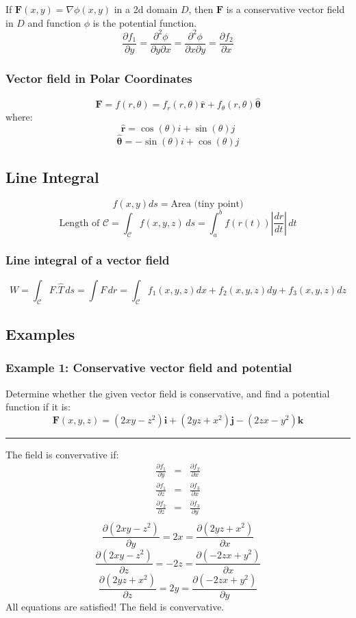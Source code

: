 If $\mathbf{F}(x,y)=\nabla\phi(x,y)$ in a 2d domain $D$, then $\mathbf{F}$ is a conservative vector field in $D$ and function $\phi$ is the potential function.
$${\frac{\partial f_{1}}{\partial y}}={\frac{\partial^{2}\phi}{\partial y\partial x}}={\frac{\partial^{2}\phi}{\partial x\partial y}}={\frac{\partial f_{2}}{\partial x}}$$
\subsubsection{Vector field in Polar Coordinates}
$$\mathbf{F}=f(r,\theta)=f_{r}(r,\theta)\mathbf{\hat{r}}+f_{\theta}(r,\theta)\mathbf{\hat{\theta}}$$
where:
$$\mathbf{\hat{r}}=\cos(\theta)i+\sin(\theta)j$$
$$\mathbf{\hat{\theta}}=-\sin(\theta)i+\cos(\theta)j$$
\subsection{Line Integral}
$$f(x,y)ds=\text{Area (tiny point)}$$
$$\text{Length of }\mathcal{C}=\int _{\mathcal{C}}f(x,y,z) \, ds=\int_{a}^{b}f(r(t)) \left|\frac{ dr }{ dt } \right| \, dt  $$
\subsubsection{Line integral of a vector field}
$$W=\int _{\mathcal{C}}F.\hat{T} \, ds =\int F \,dr =\int _{\mathcal{C}}f_{1}(x,y,z)dx+f_{2}(x,y,z)dy+f_{3}(x,y,z)dz $$
\subsection{Examples}
\subsubsection{Example 1: Conservative vector field and potential}
Determine whether the given vector field is conservative, and find a potential
function if it is:
$$\mathbf{F}(x,y,z)=( 2x y-z^{2})\mathbf{i}+( 2y z+ x^{2})\mathbf{j}-(2z x- y^{2})\mathbf{k}$$ 
\rule{\textwidth}{0.5pt}

The field is convervative if:
\begin{eqnarray*}
  \frac{\partial f_1}{\partial y}&=&\frac{\partial f_2}{\partial x} \\
  \frac{\partial f_1}{\partial z}&=&\frac{\partial f_3}{\partial x} \\
  \frac{\partial f_2}{\partial z}&=&\frac{\partial f_3}{\partial y} \\
\end{eqnarray*}
$$\frac{\partial (2xy-z^2)}{\partial y}=2x=\frac{\partial (2yz+x^2)}{\partial x} $$
$$ \frac{\partial (2xy-z^2)}{\partial z}=-2z=\frac{\partial (-2zx+y^2)}{\partial x} $$
$$\frac{\partial (2yz+x^2)}{\partial z}=2y=\frac{\partial (-2zx+y^2)}{\partial y} $$
All equations are satisfied! The field is convervative.

